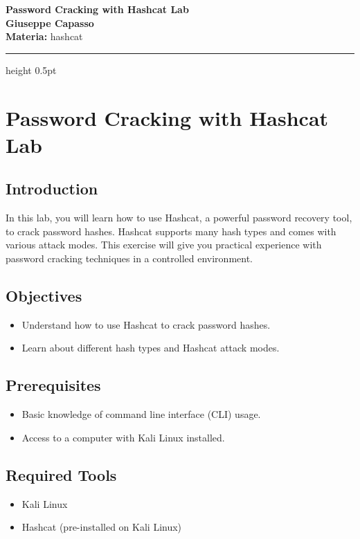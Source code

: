 \documentclass[11pt,a4paper]{article}
\providecommand{\tightlist}{%
  \setlength{\itemsep}{0pt}\setlength{\parskip}{0pt}}
\newcommand{\proposaltitle}[1]{
    \begin{center}
        \vspace*{0.1cm}
        {\LARGE \bfseries \color{blue} #1} \\[1.5ex]
        {\large \textbf{Giuseppe Capasso}} \\[1ex]
                \small{
            \vspace{0.1cm}
            \textbf{Materia:} hashcat\\
        }
            \end{center}
    \vspace{0.3cm}
    \hrule height 0.5pt
    \vspace{0.5cm}
}
\begin{document}
\proposaltitle{Password Cracking with Hashcat Lab}

\section{Password Cracking with Hashcat
Lab}\label{password-cracking-with-hashcat-lab}

\subsection{Introduction}\label{introduction}

In this lab, you will learn how to use Hashcat, a powerful password
recovery tool, to crack password hashes. Hashcat supports many hash
types and comes with various attack modes. This exercise will give you
practical experience with password cracking techniques in a controlled
environment.

\subsection{Objectives}\label{objectives}

\begin{itemize}
\tightlist
\item
  Understand how to use Hashcat to crack password hashes.
\item
  Learn about different hash types and Hashcat attack modes.
\end{itemize}

\subsection{Prerequisites}\label{prerequisites}

\begin{itemize}
\tightlist
\item
  Basic knowledge of command line interface (CLI) usage.
\item
  Access to a computer with Kali Linux installed.
\end{itemize}

\subsection{Required Tools}\label{required-tools}

\begin{itemize}
\tightlist
\item
  Kali Linux
\item
  Hashcat (pre-installed on Kali Linux)
\end{itemize}
\end{document}
